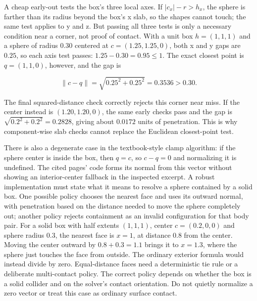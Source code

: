 A cheap early-out tests the box's three local axes. If \(|c_x|-r>h_x\), the sphere is farther than its radius beyond the box's x slab, so the shapes cannot touch; the same test applies to y and z. But passing all three tests is only a necessary condition near a corner, not proof of contact. With a unit box \(h=(1,1,1)\) and a sphere of radius \(0.30\) centered at \(c=(1.25,1.25,0)\), both x and y gaps are \(0.25\), so each axis test passes: \(1.25-0.30=0.95\le1\). The exact closest point is \(q=(1,1,0)\), however, and the gap is

\[
\|c-q\|=\sqrt{0.25^2+0.25^2}=0.3536>0.30.
\]

The final squared-distance check correctly rejects this corner near miss. If the center instead is \((1.20,1.20,0)\), the same early checks pass and the gap is \(\sqrt{0.2^2+0.2^2}=0.2828\), giving about \(0.0172\) units of penetration. This is why component-wise slab checks cannot replace the Euclidean closest-point test.

There is also a degenerate case in the textbook-style clamp algorithm: if the sphere center is inside the box, then \(q=c\), so \(c-q=0\) and normalizing it is undefined. The cited pages' code forms its normal from this vector without showing an interior-center fallback in the inspected excerpt. A robust implementation must state what it means to resolve a sphere contained by a solid box. One possible policy chooses the nearest face and uses its outward normal, with penetration based on the distance needed to move the sphere completely out; another policy rejects containment as an invalid configuration for that body pair. For a solid box with half extents \((1,1,1)\), center \(c=(0.2,0,0)\) and sphere radius \(0.3\), the nearest face is \(x=1\), at distance \(0.8\) from the center. Moving the center outward by \(0.8+0.3=1.1\) brings it to \(x=1.3\), where the sphere just touches the face from outside. The ordinary exterior formula would instead divide by zero. Equal-distance faces need a deterministic tie rule or a deliberate multi-contact policy. The correct policy depends on whether the box is a solid collider and on the solver's contact orientation. Do not quietly normalize a zero vector or treat this case as ordinary surface contact.

